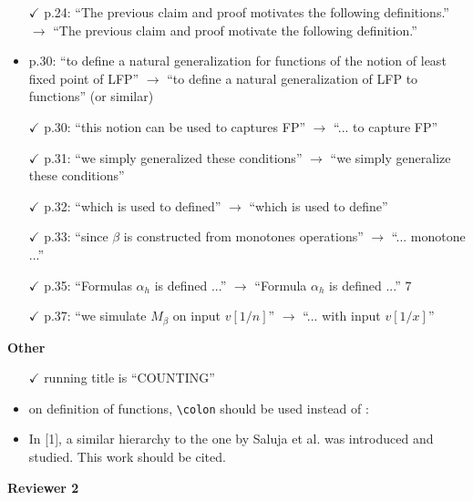 \begin{itemize}
	\item[$\checkmark$] p.24: ``The previous claim and proof motivates the following definitions.'' $\to$ ``The previous
	claim and proof motivate the following definition.''
	\item p.30: ``to define a natural generalization for functions of the notion of least fixed point of
	LFP'' $\to$ ``to define a natural generalization of LFP to functions'' (or similar)
	\item[$\checkmark$] p.30: ``this notion can be used to captures FP'' $\to$ ``... to capture FP''
	\item[$\checkmark$] p.31: ``we simply generalized these conditions'' $\to$ ``we simply generalize these conditions''
	\item[$\checkmark$] p.32: ``which is used to defined'' $\to$ ``which is used to define''
	\item[$\checkmark$] p.33: ``since $\beta$ is constructed from monotones operations'' $\to$ ``... monotone ...''
	\item[$\checkmark$] p.35: ``Formulas $\alpha_h$ is defined ...'' $\to$ ``Formula $\alpha_h$ is defined ...''
	7
	\item[$\checkmark$] p.37: ``we simulate $M_\beta$ on input $v[1/n]$'' $\to$ ``... with input $v[1/x]$''
\end{itemize}
\vspace{1em}
{\bf Other}
\begin{itemize}
	\setlength\itemsep{0.5em}
	\item[$\checkmark$] running title is ``COUNTING''
	\item on definition of functions, \verb|\colon| should be used instead of :
	\item In [1], a similar hierarchy to the one by Saluja et al. was introduced and studied. This work
	should be cited.
\end{itemize}

\bigskip

{\bf Reviewer 2}

